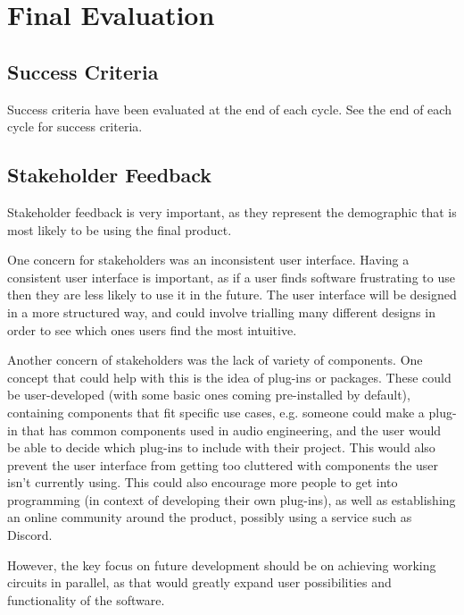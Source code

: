 \chapter{Final Evaluation}

    \section{Success Criteria}

        Success criteria have been evaluated at the end of each cycle. 
        See the end of each cycle for success criteria. 


    \section{Stakeholder Feedback}

        Stakeholder feedback is very important, as they represent the demographic that is most likely to be using the final product.


        One concern for stakeholders was an inconsistent user interface.
        Having a consistent user interface is important, as if a user finds software frustrating to use then they are less likely to use it in the future. 
        The user interface will be designed in a more structured way, and could involve trialling many different designs in order to see which ones users find the most intuitive. 

        Another concern of stakeholders was the lack of variety of components. 
        One concept that could help with this is the idea of plug-ins or packages.
        These could be user-developed (with some basic ones coming pre-installed by default), containing components that fit specific use cases, e.g. someone could make a plug-in that has common components used in audio engineering, and the user would be able to decide which plug-ins to include with their project.
        This would also prevent the user interface from getting too cluttered with components the user isn't currently using.
        This could also encourage more people to get into programming (in context of developing their own plug-ins), as well as establishing an online community around the product, possibly using a service such as Discord. 

        However, the key focus on future development should be on achieving working circuits in parallel, as that would greatly expand user possibilities and functionality of the software. 
